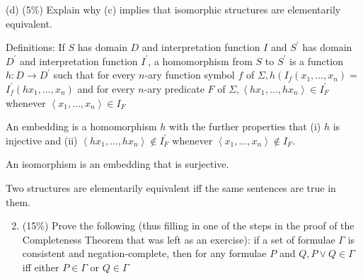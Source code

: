 \documentclass[10pt]{article}
\begin{document}
(d) (5\%) Explain why (c) implies that isomorphic structures are elementarily equivalent.

Definitions: If \(S\) has domain \(D\) and interpretation function \(I\) and \(S^{\prime}\) has domain \(D^{\prime}\) and interpretation function \(I^{\prime}\), a homomorphism from \(S\) to \(S^{\prime}\) is a function \(h: D \rightarrow D^{\prime}\) such that for every \(n\)-ary function symbol \(f\) of \(\Sigma, h\left(I_{f}\left(x_{1}, \ldots, x_{n}\right)=\right.\) \(I_{f}^{\prime}\left(h x_{1}, \ldots, x_{n}\right)\) and for every \(n\)-ary predicate \(F\) of \(\Sigma,\left\langle h x_{1}, \ldots, h x_{n}\right\rangle \in I_{F}^{\prime}\) whenever \(\left\langle x_{1}, \ldots, x_{n}\right\rangle \in I_{F}\)

An embedding is a homomorphism \(h\) with the further properties that (i) \(h\) is injective and (ii) \(\left\langle h x_{1}, \ldots, h x_{n}\right\rangle \notin I_{F}^{\prime}\) whenever \(\left\langle x_{1}, \ldots, x_{n}\right\rangle \notin I_{F}\).

An isomorphism is an embedding that is surjective.

Two structures are elementarily equivalent iff the same sentences are true in them.

\begin{enumerate}
  \setcounter{enumi}{1}
  \item (15\%) Prove the following (thus filling in one of the steps in the proof of the Completeness Theorem that was left as an exercise): if a set of formulae \(\Gamma\) is consistent and negation-complete, then for any formulae \(P\) and \(Q, P \vee Q \in \Gamma\) iff either \(P \in \Gamma\) or \(Q \in \Gamma\)
\end{enumerate}
\end{document}
